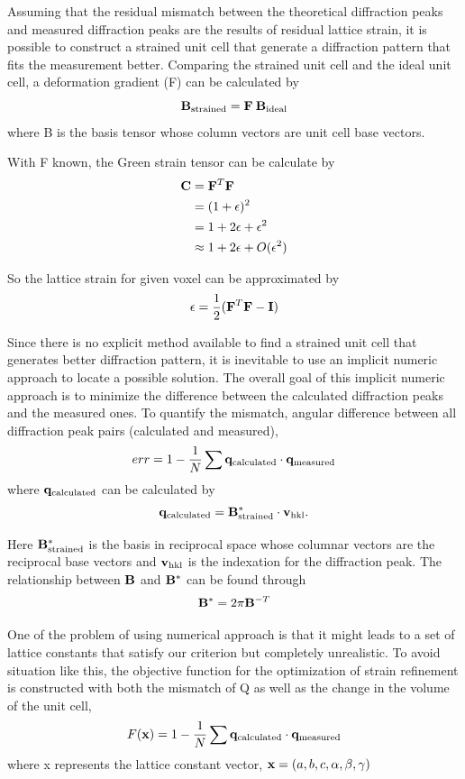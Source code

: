 \documentclass[12pt]{scrartcl}
\begin{document}
\begin{enumerate}
Assuming that the residual mismatch between the theoretical diffraction peaks and measured diffraction peaks are the results of residual lattice strain, it is possible to construct a strained unit cell that generate a diffraction pattern that fits the measurement better.
Comparing the strained unit cell and the ideal unit cell, a deformation gradient (\tnsr F) can be calculated by
\[
	\mathbf{B}_\text{strained} = \mathbf{F} \: \mathbf{B}_\text{ideal}
\]
where \tnsr B is the basis tensor whose column vectors are unit cell base vectors.

With \tnsr F known, the Green strain tensor can be calculate by
\begin{align*}
	\mathbf{C} &= \mathbf{F}^T \mathbf{F} \\
	            &= (1 + \mathbf{\epsilon})^2 \\
	            &= 1 + 2\epsilon + \epsilon^2 \\
	            &\approx 1 + 2\epsilon + O(\epsilon^2)
\end{align*}

So the lattice strain for given voxel can be approximated by
\[
	\epsilon = \dfrac{1}{2} (\mathbf{F}^T\mathbf{F} - \mathbf{I})
\]

Since there is no explicit method available to find a strained unit cell that generates better diffraction pattern, it is inevitable to use an implicit numeric approach to locate a possible solution.
The overall goal of this implicit numeric approach is to minimize the difference between the calculated diffraction peaks and the measured ones.
To quantify the mismatch, angular difference between all diffraction peak pairs (calculated and measured),
\[
	err = 1 - \dfrac{1}{N} \sum \mathbf{q}_\text{calculated} \cdot \mathbf{q}_\text{measured}
\]
where $\mathbf{q}_\text{calculated}$ can be calculated by
\[
	\mathbf{q}_\text{calculated} = \mathbf{B}^*_\text{strained} \cdot \mathbf{v}_\text{hkl}.
\]

Here $\mathbf{B}^*_\text{strained}$ is the basis in reciprocal space whose columnar vectors are the reciprocal base vectors and $\mathbf{v}_\text{hkl}$ is the indexation for the diffraction peak.
The relationship between $\mathbf{B}$ and $\mathbf{B}^*$ can be found through
\[
	\mathbf{B}^* = 2 \pi \mathbf{B}^{-T}
\]

One of the problem of using numerical approach is that it might leads to a set of lattice constants that satisfy our criterion but completely unrealistic. 
To avoid situation like this, the objective function for the optimization of strain refinement is constructed with both the mismatch of \tnsr Q as well as the change in the volume of the unit cell, 
\[
	F(\mathbf{x}) = 1 - \dfrac{1}{N} \sum \mathbf{q}_\text{calculated} \cdot \mathbf{q}_\text{measured}
\]
where \tnsr x represents the lattice constant vector, $\mathbf{x} = (a,b,c,\alpha,\beta,\gamma)$


\end{enumerate}
\end{document}
